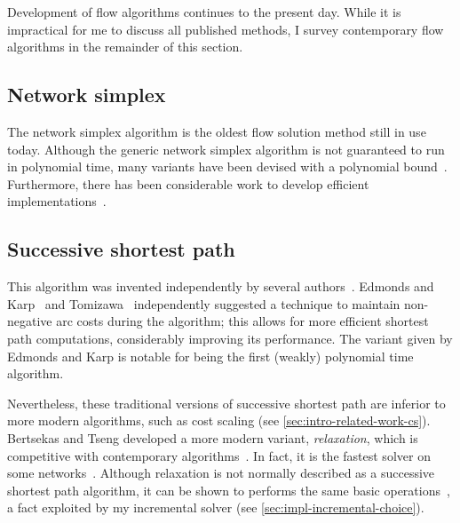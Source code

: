 
Development of flow algorithms continues to the present day. While it is impractical for me to discuss all published methods, I survey contemporary flow algorithms in the remainder of this section.

\subsection{Network simplex}

The network simplex algorithm is the oldest flow solution method still in use today. Although the generic network simplex algorithm is not guaranteed to run in polynomial time, many variants have been devised with a polynomial bound~\cite{Tarjan:1991,Goldfarb:1992}. Furthermore, there has been considerable work to develop efficient implementations~\cite{Lobel:1996,Grigoriadis:1986}.

\subsection{Successive shortest path} \label{sec:intro-related-work-ssp}

This algorithm was invented independently by several authors~\cite{Jewell:1958,Iri:1960,BusackerGowen:1960}. Edmonds and Karp~\cite{Edmonds:1972} and Tomizawa~\cite{Tomizawa:1971} independently suggested a technique to maintain non-negative arc costs during the algorithm; this allows for more efficient shortest path computations, considerably improving its performance. The variant given by Edmonds and Karp is notable for being the first (weakly) polynomial time algorithm\footnotemark.

Nevertheless, these traditional versions of successive shortest path are inferior to more modern algorithms, such as cost scaling (see \cref{sec:intro-related-work-cs}). Bertsekas and Tseng developed a more modern variant, \emph{relaxation}, which is competitive with contemporary algorithms~\cite{BertsekasMethod:1988,BertsekasCodes:1988,BertsekasTseng:94}. In fact, it is the fastest solver on some networks~\cite{KiralyKovacs:2012}. Although relaxation is not normally described as a successive shortest path algorithm, it can be shown to performs the same basic operations~\cite[\S9.10]{Ahuja:1993}, a fact exploited by my incremental solver (see \cref{sec:impl-incremental-choice}). 

